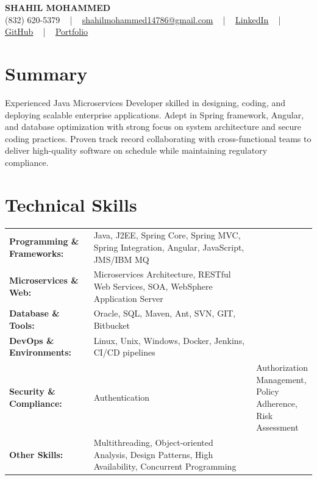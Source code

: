\documentclass[letterpaper,11pt]{article}
\begin{document}
\begin{center}
    {\fontsize{14pt}{12pt}\selectfont \textbf{\MakeUppercase{Shahil Mohammed}}}\\ \vspace{2pt}
    \fontsize{10pt}{12pt}\selectfont (832) 620-5379 ~ | ~ \href{mailto:shahilmohammed14786@gmail.com}{shahilmohammed14786@gmail.com} ~ | ~  
    \href{https://www.linkedin.com/in/shahil-mohammed-9652931a1/}{\color{blue}\underline{LinkedIn}}  ~ | ~ 
    \href{https://github.com/freakbeast14}{\color{blue}\underline{GitHub}} ~ | ~ 
    \href{https://shahil-mohammed.netlify.app/}{\color{blue}\underline{Portfolio}}
    \vspace{-8pt}
\end{center}

\section{Summary}
\fontsize{9pt}{10pt}\selectfont
Experienced Java Microservices Developer skilled in designing, coding, and deploying scalable enterprise applications. Adept in Spring framework, Angular, and database optimization with strong focus on system architecture and secure coding practices. Proven track record collaborating with cross-functional teams to deliver high-quality software on schedule while maintaining regulatory compliance.
 \vspace{-5pt}
 
\section{Technical Skills}
        \vspace{-14pt}
        \begin{table}[h]
            \fontsize{9pt}{10pt}\selectfont
            \begin{tabular}{p{0.3\linewidth} p{0.7\linewidth}}
                \textbf{Programming \& Frameworks:} & Java, J2EE, Spring Core, Spring MVC, Spring Integration, Angular, JavaScript, JMS/IBM MQ \\
                \textbf{Microservices \& Web:} & Microservices Architecture, RESTful Web Services, SOA, WebSphere Application Server \\
                \textbf{Database \& Tools:} & Oracle, SQL, Maven, Ant, SVN, GIT, Bitbucket \\
                \textbf{DevOps \& Environments:} & Linux, Unix, Windows, Docker, Jenkins, CI/CD pipelines \\
                \textbf{Security \& Compliance:} & Authentication & Authorization Management, Policy Adherence, Risk Assessment \\
                \textbf{Other Skills:} & Multithreading, Object-oriented Analysis, Design Patterns, High Availability, Concurrent Programming \\
            \end{tabular}
        \end{table}
 \vspace{-15pt}
 
\end{document}
